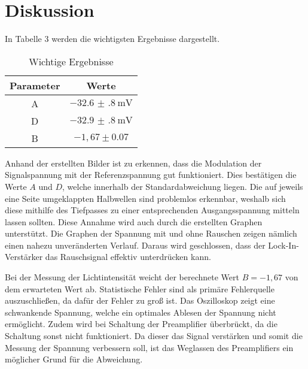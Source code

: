 \section{Diskussion}
\label{sec:Diskussion}

In Tabelle 3 werden die wichtigsten Ergebnisse dargestellt.
\begin{table}[H]
  \centering
  \caption{Wichtige Ergebnisse}
  \label{tab:Phase}
  \begin{tabular}{c c}
    \toprule
    Parameter & Werte \\
    \midrule
    A & $\SI{-32.6(8)}{\milli\volt}$ \\
    D & $\SI{-32.9(8)}{\milli\volt}$ \\
    B & $-1,67 \pm 0.07$ \\
    \bottomrule
  \end{tabular}
\end{table}



Anhand der erstellten Bilder ist zu erkennen, dass die Modulation der Signalspannung mit der Referenzspannung gut funktioniert. Dies bestätigen
die Werte $A$ und $D$, welche innerhalb der Standardabweichung liegen.
Die auf jeweils eine Seite umgeklappten Halbwellen sind problemlos erkennbar, weshalb sich diese mithilfe des
Tiefpasses zu einer entsprechenden Ausgangsspannung mitteln lassen sollten. Diese Annahme wird auch durch die erstellten
Graphen unterstützt.
Die Graphen der Spannung mit und ohne Rauschen zeigen nämlich einen nahezu unveränderten Verlauf. Daraus wird geschlossen, dass der
Lock-In-Verstärker das Rauschsignal effektiv unterdrücken kann.

Bei der Messung der Lichtintensität weicht der berechnete Wert $B=-1,67$  von dem erwarteten Wert ab.
Statistische Fehler sind als primäre Fehlerquelle auszuschließen, da dafür der Fehler zu groß ist.
Das Oszilloskop zeigt eine schwankende Spannung, welche
ein optimales Ablesen der Spannung nicht ermöglicht. Zudem wird bei Schaltung der Preamplifier überbrückt, da die Schaltung sonst nicht
funktioniert. Da dieser das Signal verstärken und somit die Messung der Spannung verbessern soll, ist das Weglassen des
Preamplifiers ein möglicher Grund für die Abweichung.
